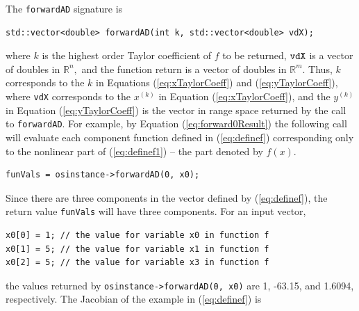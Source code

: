 \documentclass[11pt]{article}
\renewcommand{\_}{{\char"5F}}
\renewcommand{\{}{{\char"7B}}
\renewcommand{\}}{{\char"7D}}
\renewcommand{\^}{{\char"0D}}
\renewcommand{\'}{{\char"0D}}
\begin{document}
\begin{enumerate}[Step 1:]
The {\tt forwardAD} signature is
\begin{verbatim}
std::vector<double> forwardAD(int k, std::vector<double> vdX);
\end{verbatim}
where $k$ is the highest order Taylor coefficient of $f$ to be returned,  $\tt vdX$ is a vector of doubles in $ \mathbb{R}^{n},$ and the function return is a vector of doubles in $ \mathbb{R}^{m}.$  Thus, $k$ corresponds to the $k$ in Equations  (\ref{eq:xTaylorCoeff}) and (\ref{eq:yTaylorCoeff}),  where {\tt vdX} corresponds to the $x^{(k)}$ in Equation (\ref{eq:xTaylorCoeff}), and the $y^{(k)}$ in Equation (\ref{eq:yTaylorCoeff}) is the vector in range space returned by the call to {\tt  forwardAD}.    For example, by  Equation (\ref{eq:forward0Result}) the following call will evaluate each component function defined in (\ref{eq:definef}) corresponding only to the nonlinear part of (\ref{eq:definef1}) -- the part denoted by $f(x)$.
\begin{verbatim}
funVals = osinstance->forwardAD(0, x0);
\end{verbatim}
Since there are three components in the vector defined by  (\ref{eq:definef}), the return value  {\tt funVals} will have three components. For an input vector,
\begin{verbatim}
x0[0] = 1; // the value for variable x0 in function f
x0[1] = 5; // the value for variable x1 in function f
x0[2] = 5; // the value for variable x3 in function f
\end{verbatim}
the values returned by {\tt osinstance->forwardAD(0, x0)}  are 1, -63.15, and 1.6094, respectively.
The Jacobian of the example in (\ref{eq:definef}) is


\end{enumerate}
\end{document}
